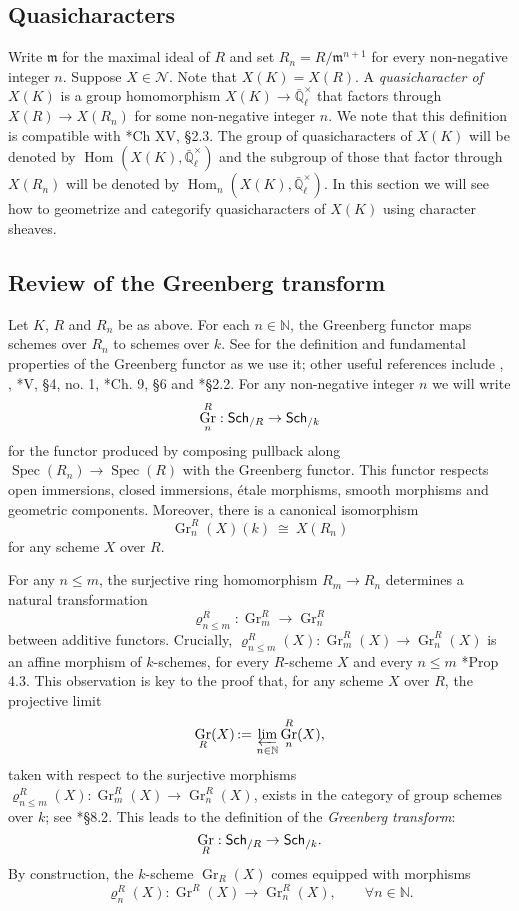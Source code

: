 \documentclass[10pt]{amsart}
\theoremstyle{plain}
\theoremstyle{definition}
\newcommand{\NN}{{\mathbb{N}}}
\newcommand{\EE}{\mathbb{\bar Q}_\ell}
\newcommand{\Fq}{k}
\newcommand{\EEx}{\EE^\times}
\newcommand{\m}{{\mathfrak{m}}}
\DeclareMathOperator{\Hom}{Hom}
\DeclareMathOperator{\Gr}{Gr}
\newcommand{\Spec}[1]{{\operatorname{Spec}(#1)}}
\newcommand{\ceq}{{\, :=\, }}
\newcommand{\iso}{{\ \cong\ }}
\newcommand{\catname}[1]{\normalfont{\textsf{#1}}}
\newcommand{\Sch}[1]{{\catname{Sch}_{/#1}}}
\begin{document}
\subsection{Quasicharacters}\label{ssec:quasicharacters}

Write $\m$ for the maximal ideal of $R$ and set $R_n = R/\m^{n+1}$ for every non-negative integer $n$.
Suppose $X \in \mathcal{N}$.
Note that $X(K) = X(R)$.
A \emph{quasicharacter of $X(K)$} is a group homomorphism $X(K) \to \EEx$ that factors through
$X(R) \to X(R_n)$ for some non-negative integer $n$.
We note that this definition is compatible with \cite{cassels-frohlich:AlgebraicNumberTheory}*{Ch XV, \S 2.3}.
The group of quasicharacters of $X(K)$ will be denoted by 
$\Hom_\text{}(X(K),\EEx)$
 and the subgroup of those that factor through $X(R_n)$ will be denoted by $\Hom_n(X(K),\EEx)$.
In this section we will see how to geometrize and categorify quasicharacters of $X(K)$ using character sheaves.

\subsection{Review of the Greenberg transform} \label{ssec:rev_Greenberg}

Let $K$, $R$ and $R_n$ be as above.
For each $n \in \NN$, the Greenberg functor maps schemes over $R_n$ to schemes over $\Fq$.
See \cite{bertrapelle-gonzales:Greenberg} for the definition and fundamental properties of the
Greenberg functor as we use it; other useful references include
\cite{greenberg:61}, \cite{greenberg:63a},
\cite{demazure-gabriel:GroupesAlgebriques}*{V, \S 4, no. 1},
\cite{bosch-lutkebohmert-reynaud:NeronModels}*{Ch. 9, \S 6} and
\cite{nicaise-sebag:motivicSerre}*{\S 2.2}. %
%
For any non-negative integer $n$ we will write
\[
\Gr^R_n : \Sch{R} \to \Sch{\Fq}
\]
for the functor produced by composing pullback along $\Spec{R_n} \to \Spec{R}$ with the Greenberg functor. 
This functor respects open immersions, closed immersions, \'etale morphisms, smooth morphisms and
geometric components.  Moreover, there is a canonical isomorphism
\[
\Gr^R_n(X)(\Fq) \iso X(R_n)
\]
for any scheme $X$ over $R$.

For any $n\leq m$,  the surjective ring homomorphism $R_{m} \to R_n$ determines a
natural transformation 
\[
\varrho^R_{n\leq m} : \Gr^R_{m} \to \Gr^R_n
\]
between additive functors.
Crucially, $\varrho^R_{n\leq m}(X): \Gr^R_{m}(X)\to \Gr^R_n(X)$ is an affine morphism of $\Fq$-schemes,
for every $R$-scheme $X$ and every $n\leq m$ \cite{bertrapelle-gonzales:Greenberg}*{Prop 4.3}.
This observation is key to the proof that, for any scheme $X$ over $R$, the projective limit 
\[
\Gr_R(X) \ceq \varprojlim_{n\in \NN} \Gr^R_n(X),
\]
taken with respect to the surjective morphisms $\varrho^R_{n\leq m}(X) : \Gr^R_{m}(X) \to \Gr^R_n(X)$,
exists in the category of group schemes over $\Fq$;
see \cite{EGAIV3}*{\S 8.2}.
This leads to the definition of the {\it Greenberg transform}:
\[
\Gr_R : \Sch{R} \to \Sch{\Fq}.
\]
By construction, the $\Fq$-scheme $\Gr_R(X)$ comes equipped with morphisms 
\[
\varrho^R_n(X) : \Gr^R(X) \to \Gr^R_n(X),\qquad \forall n\in \NN.
\]
\end{document}
